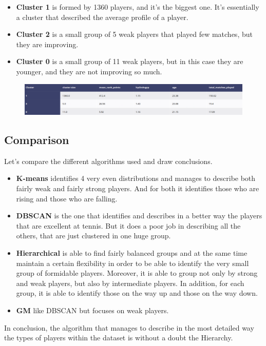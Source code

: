 \begin{itemize}
    \item{ \textbf{Cluster 1} is formed by 1360 players, and it's the biggest one. It's essentially a cluster that described the average profile of a player.}
    \item{ \textbf{Cluster 2} is a small group of 5 weak players that played few matches, but they are improving.}
    \item{\textbf{Cluster 0} is a small group of 11 weak players, but in this case they are younger, and they are not improving so much.}
\end{itemize}

\begin{figure}[h]
\centering
\includegraphics[width=.6\textwidth]{plots/gaussian_mixture//gm_results}
\label{fig:gm_results}
\end{figure}

\subsection{Comparison}
Let's compare the different algorithms used and draw conclusions.

\begin{itemize}
    \item{ \textbf{K-means} identifies 4 very even distributions and manages to describe both fairly weak and fairly strong players. And for both it identifies those who are rising and those who are falling.  }
    \item{ \textbf{DBSCAN} is the one that identifies and describes in a better way the players that are excellent at tennis. But it does a poor job in describing all the others, that are just clustered in one huge group.}
    \item{\textbf{Hierarchical} is able to find fairly balanced groups and at the same time maintain a certain flexibility in order to be able to identify the very small group of formidable players. Moreover, it is able to group not only by strong and weak players, but also by intermediate players. In addition, for each group, it is able to identify those on the way up and those on the way down.}
    \item{\textbf{GM}} like DBSCAN but focuses on weak players.
\end{itemize}

In conclusion, the algorithm that manages to describe in the most detailed way the types of players within the dataset is without a doubt the Hierarchy.
